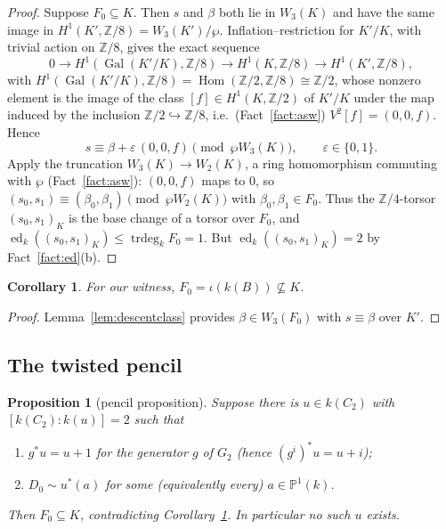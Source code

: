 \documentclass[11pt]{amsart}
\newtheorem{proposition}[theorem]{Proposition}
\newtheorem{corollary}[theorem]{Corollary}
\theoremstyle{definition}
\theoremstyle{remark}
\newcommand{\ed}{\operatorname{ed}}
\newcommand{\tr}{\operatorname{trdeg}}
\newcommand{\Z}{\mathbb Z}
\newcommand{\PP}{\mathbb P}
\newcommand{\Hom}{\operatorname{Hom}}
\newcommand{\Gal}{\operatorname{Gal}}
\begin{document}
\begin{proof}
Suppose $F_0\subseteq K$. Then $s$ and $\beta$ both lie in $W_3(K)$ and have the same
image in $H^1(K',\Z/8)=W_3(K')/\wp$. Inflation--restriction for $K'/K$, with trivial
action on $\Z/8$, gives the exact sequence
\[
0\to H^1(\Gal(K'/K),\Z/8)\to H^1(K,\Z/8)\to H^1(K',\Z/8),
\]
with $H^1(\Gal(K'/K),\Z/8)=\Hom(\Z/2,\Z/8)\cong\Z/2$,
whose nonzero element is the image of the class $[f]\in H^1(K,\Z/2)$ of $K'/K$ under
the map induced by the inclusion $\Z/2\hookrightarrow\Z/8$, i.e.\ (Fact~\ref{fact:asw})
$V^2[f]=(0,0,f)$. Hence
\[
s\equiv\beta+\varepsilon\,(0,0,f)\pmod{\wp W_3(K)},\qquad\varepsilon\in\{0,1\}.
\]
Apply the truncation $W_3(K)\to W_2(K)$, a ring homomorphism commuting with $\wp$
(Fact~\ref{fact:asw}): $(0,0,f)$ maps to $0$, so
$(s_0,s_1)\equiv(\beta_0,\beta_1)\pmod{\wp W_2(K)}$ with $\beta_0,\beta_1\in F_0$.
Thus the $\Z/4$-torsor $(s_0,s_1)_K$ is the base change of a torsor over $F_0$, and
$\ed_k((s_0,s_1)_K)\le\tr_kF_0=1$. But $\ed_k((s_0,s_1)_K)=2$ by Fact~\ref{fact:ed}(b).
\end{proof}

\begin{corollary}\label{cor:F0notinK}
For our witness, $F_0=\iota(k(B))\not\subseteq K$.
\end{corollary}

\begin{proof}
Lemma~\ref{lem:descentclass} provides $\beta\in W_3(F_0)$ with $s\equiv\beta$ over $K'$.
\end{proof}

\subsection{The twisted pencil}

\begin{proposition}[pencil proposition]\label{prop:pencil}
Suppose there is $u\in k(C_2)$ with $[k(C_2):k(u)]=2$ such that
\begin{enumerate}[label=\textup{(H\arabic*)}]
\item $g^*u=u+1$ for the generator $g$ of $G_2$ (hence $(g^i)^*u=u+i$);
\item $D_0\sim u^*(a)$ for some (equivalently every) $a\in\PP^1(k)$.
\end{enumerate}
Then $F_0\subseteq K$, contradicting Corollary~\ref{cor:F0notinK}. In particular no such
$u$ exists.
\end{proposition}
\end{document}
